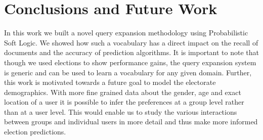 \section{Conclusions and Future Work}
In this work we built a novel query expansion methodology using Probabilistic Soft Logic.
We showed how such a vocabulary has a direct impact on the recall of documents and the accuracy of prediction algorithms.
It is important to note that though we used elections to show performance gains, the query expansion system is generic and can be used to learn a vocabulary for any given domain.
Further, this work is motivated towards a future goal to model the electorate demographics.
With more fine grained data about the gender, age and exact location of a user it is possible to infer the preferences at a group level rather than at a user level.
This would enable us to study the various interactions between groups and individual users in more detail and thus make more informed election predictions.